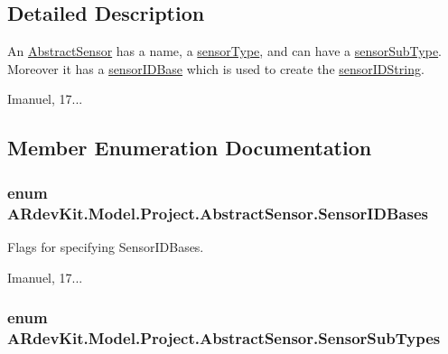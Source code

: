 \subsection{Detailed Description}
An \hyperlink{class_a_rdev_kit_1_1_model_1_1_project_1_1_abstract_sensor}{Abstract\-Sensor} has a name, a \hyperlink{class_a_rdev_kit_1_1_model_1_1_project_1_1_abstract_sensor_a01251db96ea5e0fb0abe1df0a129e751}{sensor\-Type}, and can have a \hyperlink{class_a_rdev_kit_1_1_model_1_1_project_1_1_abstract_sensor_a29b9e916f374e31196689e9d7ac73123}{sensor\-Sub\-Type}. Moreover it has a \hyperlink{class_a_rdev_kit_1_1_model_1_1_project_1_1_abstract_sensor_a2f9524a6aba4331373c0c1968b2f6f4d}{sensor\-I\-D\-Base} which is used to create the \hyperlink{class_a_rdev_kit_1_1_model_1_1_project_1_1_abstract_sensor_ae12a6c3bfe5686d888d7e36c9b19df47}{sensor\-I\-D\-String}. 

Imanuel, 17... 

\subsection{Member Enumeration Documentation}
\hypertarget{class_a_rdev_kit_1_1_model_1_1_project_1_1_abstract_sensor_a8eecc60106e6a54a3e096c63a7d4d012}{
\subsubsection[{Sensor\-I\-D\-Bases}]{\setlength{\rightskip}{0pt plus 5cm}enum {\bf A\-Rdev\-Kit.\-Model.\-Project.\-Abstract\-Sensor.\-Sensor\-I\-D\-Bases}}}\label{class_a_rdev_kit_1_1_model_1_1_project_1_1_abstract_sensor_a8eecc60106e6a54a3e096c63a7d4d012}


Flags for specifying Sensor\-I\-D\-Bases. 

Imanuel, 17... \hypertarget{class_a_rdev_kit_1_1_model_1_1_project_1_1_abstract_sensor_af7b41fc81d926ed779ca02ef894fcddf}{
\subsubsection[{Sensor\-Sub\-Types}]{\setlength{\rightskip}{0pt plus 5cm}enum {\bf A\-Rdev\-Kit.\-Model.\-Project.\-Abstract\-Sensor.\-Sensor\-Sub\-Types}}}\label{class_a_rdev_kit_1_1_model_1_1_project_1_1_abstract_sensor_af7b41fc81d926ed779ca02ef894fcddf}


